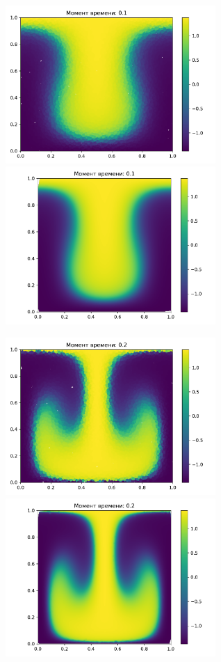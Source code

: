    \begin{figure}[H]
        \centering
        \includegraphics[width=8cm]{pictures/s5.pdf}
        \includegraphics[width=8cm]{pictures/p5.pdf}
    \end{figure}
    \begin{figure}[H]
        \centering
        \includegraphics[width=8cm]{pictures/s10.pdf}
        \includegraphics[width=8cm]{pictures/p10.pdf}
    \end{figure}
